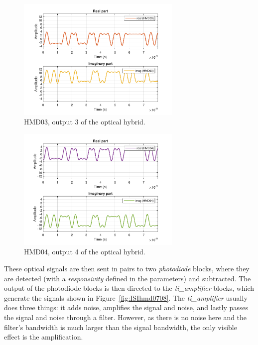 		\begin{figure}[H]
			\centering
				\includegraphics[width=0.7\textwidth]
				{./sdf/m_qam_system/figures/simulations/01_noISI/HMD03.pdf}
		\caption{HMD03, output 3 of the optical hybrid.}
				\end{figure}
	\begin{figure}[H]
				\centering
				\includegraphics[width=0.7\textwidth]
				{./sdf/m_qam_system/figures/simulations/01_noISI/HMD04.pdf}
		\caption{HMD04, output 4 of the optical hybrid.}
		\end{figure}
		
	These optical signals are then sent in pairs to two \textit{photodiode} 
	blocks, where they are detected (with a \textit{responsivity} defined in the 
	parameters) and 
	subtracted. The output of the photodiode 
	blocks is then directed to the \textit{ti\_amplifier} blocks, which generate 
	the signals shown in Figure~\ref{fig:ISIhmd0708}. The \textit{ti\_amplifier} 
	usually does three things: it adds noise, amplifies the signal and noise, and 
	lastly passes the signal and noise through a filter. However, as there is no 
	noise here and the filter's bandwidth is much larger than the signal 
	bandwidth, the only visible effect is the amplification.

